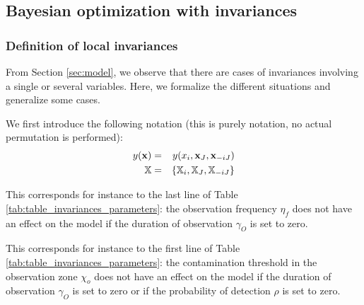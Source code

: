 \subsection{Bayesian optimization with invariances}

\subsubsection{Definition of local invariances}
From Section \ref{sec:model}, we observe that there are cases of invariances involving a single or several variables. 
Here, we formalize the different situations  and generalize some cases.

We first introduce the following notation (this is purely notation, no actual permutation is performed):
\begin{eqnarray}
 y(\mathbf{x}) &=& y(x_i, \mathbf{x}_J, \mathbf{x}_{-iJ})\\
 \mathbb{X} &=& \{\mathbb{X}_i, \mathbb{X}_J, \mathbb{X}_{-iJ} \}
\end{eqnarray}

This corresponds for instance to the last line of Table \ref{tab:table_invariances_parameters}: the observation frequency $\eta_f$ does not have an effect on the model if the duration of observation $\gamma_O$ is set to zero.

This corresponds for instance to the first line of Table \ref{tab:table_invariances_parameters}: the contamination threshold in the observation zone $\chi_o$  
does not have an effect on the model if the duration of observation $\gamma_O$ is set to zero or if the probability of detection $\rho$ is set to zero.

